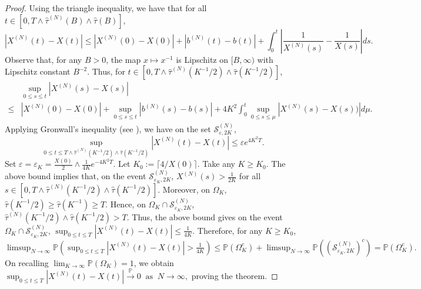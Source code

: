 \documentclass[11pt, reqno]{article}
\numberwithin{equation}{section}
\numberwithin{theorem}{section}
\newcommand{\pto}{\ensuremath{\xrightarrow{\ \mathbb{P}\ }}}  %
\begin{document}
\begin{proof}
Using the triangle inequality, we have that for all $ t\in[0,T\wedge\hat{\tau}^{(N)}(B) \wedge \hat{\tau}(B)]$, 
\begin{equation*}
     \left|X^{(N)}(t)-X(t)\right|\leq \left|X^{(N)}(0)-X(0)\right|+\left|b^{(N)}(t)-b(t)\right|+\int_0^t\left|\frac{1}{X^{(N)}(s)}-\frac{1}{X(s)}\right|ds.
\end{equation*}
Observe that, for any $B >0$, the map $x \mapsto x^{-1}$ is Lipschitz on $[B, \infty)$ with Lipschitz constant $B^{-2}$. Thus, for $t\in[0,T\wedge\hat{\tau}^{(N)}(K^{-1}/2) \wedge \hat{\tau}(K^{-1}/2)]$,
\begin{align*}
    &\sup_{0\leq s\leq t}\left|X^{(N)}(s) -X(s)\right|\\
    \leq & \left|X^{(N)}(0)-X(0)\right|+\sup_{0\leq s\leq t}\left|b^{(N)}(s)-b(s)\right|+ 4K^2\int_0^t\sup_{0\leq s\leq \mu}\left|X^{(N)}(s)-X(s))\right|d\mu.
\end{align*}
Applying Gronwall's inequality (see \cite[Lemma 4.1]{pang07}), we have on the set $\mathcal{S}^{(N)}_{\varepsilon, 2K}$,
$$
    \sup_{0\leq t\leq T\wedge\hat{\tau}^{(N)}(K^{-1}/2) \wedge \hat{\tau}(K^{-1}/2)} |X^{(N)}(t)-X(t)|\leq \varepsilon e^{4K^2T}.
$$
Set $\varepsilon = \varepsilon_K = \frac{X(0)}{2} \wedge \frac{1}{4K} e^{-4K^2T}$. Let $K_0:= \lceil 4/X(0)\rceil$. Take any $K \ge K_0$. The above bound implies that, on the event $\mathcal{S}^{(N)}_{\varepsilon_K, 2K}$, $X^{(N)}(s) > \frac{1}{2K}$ for all $s \in[0,T\wedge\hat{\tau}^{(N)}(K^{-1}/2) \wedge \hat{\tau}(K^{-1}/2)]$. Moreover, on $\Omega_K$, $\hat{\tau}(K^{-1}/2) \ge \hat{\tau}(K^{-1}) \ge T$. Hence, on $\Omega_K \cap\mathcal{S}^{(N)}_{\varepsilon_K, 2K}$, $\hat{\tau}^{(N)}(K^{-1}/2)  \wedge \hat{\tau}(K^{-1}/2)  > T$. Thus, the above bound gives on the event $\Omega_K \cap\mathcal{S}^{(N)}_{\varepsilon_K, 2K}$,
$
 \sup_{0\leq t\leq T} |X^{(N)}(t)-X(t)|\leq \frac{1}{4K}.
$
Therefore, for any $K \ge K_0$,
$
\limsup_{N \rightarrow \infty}\mathbb{P}\left( \sup_{0\leq t\leq T} |X^{(N)}(t)-X(t)| > \frac{1}{4K}\right) \le \mathbb{P}\left(\Omega_K^c\right) + \limsup_{N \rightarrow \infty}\mathbb{P}\left(\left(\mathcal{S}^{(N)}_{\varepsilon_K, 2K}\right)^c\right) = \mathbb{P}\left(\Omega_K^c\right).
$
On recalling $\lim_{K \rightarrow \infty}\mathbb{P}\left(\Omega_K\right) = 1$, we obtain
$
\sup_{0\leq t\leq T} |X^{(N)}(t)-X(t)| \pto 0 \ \text{ as } \ N \rightarrow \infty,
$
proving the theorem.
\end{proof}
\end{document}
